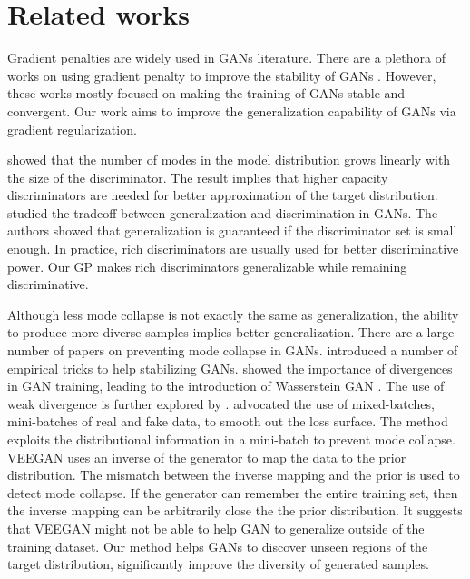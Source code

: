\documentclass{article} %
\begin{document}
\section{Related works}
Gradient penalties are widely used in GANs literature. There are a plethora of works on using gradient penalty to improve the stability of GANs \citep{whichGANConverge, wgangp, wganlp, stabilizingGAN, lsgan}. However, these works mostly focused on making the training of GANs stable and convergent. Our work aims to improve the generalization capability of GANs via gradient regularization.

\cite{doGANLearnDist} showed that the number of modes in the model distribution grows linearly with the size of the discriminator. The result implies that higher capacity discriminators are needed for better approximation of the target distribution. \cite{disGenTradoff} studied the tradeoff between generalization and discrimination in GANs. The authors showed that generalization is guaranteed if the discriminator set is small enough. In practice, rich discriminators are usually used for better discriminative power. Our GP makes rich discriminators generalizable while remaining discriminative.

Although less mode collapse is not exactly the same as generalization, the ability to produce more diverse samples implies better generalization. There are a large number of papers on preventing mode collapse in GANs. 
\cite{dcgan, improvedGAN} introduced a number of empirical tricks to help stabilizing GANs. \cite{towardPrincipledGAN} showed the importance of divergences in GAN training, leading to the introduction of Wasserstein GAN \citep{wgan}. The use of weak divergence is further explored by \cite{fishergan, sobolevgan}. 
\cite{mixedSymmetricGAN} advocated the use of mixed-batches, mini-batches of real and fake data, to smooth out the loss surface. The method exploits the distributional information in a mini-batch to prevent mode collapse.
VEEGAN \citep{veegan} uses an inverse of the generator to map the data to the prior distribution. The mismatch between the inverse mapping and the prior is used to detect mode collapse. If the generator can remember the entire training set, then the inverse mapping can be arbitrarily close the the prior distribution. It suggests that VEEGAN might not be able to help GAN to generalize outside of the training dataset. Our method helps GANs to discover unseen regions of the target distribution, significantly improve the diversity of generated samples.
\end{document}
